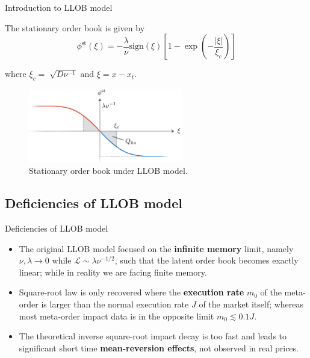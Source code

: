 \documentclass{beamer}
\begin{document}
\begin{frame}{Introduction to LLOB model}

The stationary order book is given by 
\begin{equation}
\phi^\text{st}(\xi) = -\frac{\lambda}{\nu}\text{sign}(\xi)\left[1-\exp\left(-\frac{|\xi|}{\xi_c}\right)\right]
\end{equation}

where $\xi_c =\sqrt[]{D\nu^{-1}}$ and $\xi=x-x_t$.

\begin{figure}
\centering
\includegraphics[width=0.6\textwidth]{figure1.PNG}
\caption{\label{fig:f1}Stationary order book under LLOB model.}
\end{figure}

\end{frame}

\subsection{Deficiencies of LLOB model}

\begin{frame}{Deficiencies of LLOB model}

\begin{itemize}
\item The original LLOB model focused on the \textbf{infinite memory} limit, namely $\nu, \lambda \to 0$ while $\mathcal{L} \sim \lambda \nu^{-1/2}$, such that the latent order book becomes exactly linear; while in reality we are facing finite memory. \newline
\item Square-root law is only recovered where the \textbf{execution rate} $m_0$ of the meta-order is larger than the normal execution rate $J$ of the market itself; whereas most meta-order impact data is in the opposite limit $m_0 \lesssim 0.1J$. \newline
\item The theoretical inverse square-root impact decay is too fast and leads to significant short time \textbf{mean-reversion effects}, not observed in real prices.
\end{itemize}

\end{frame}
\end{document}
